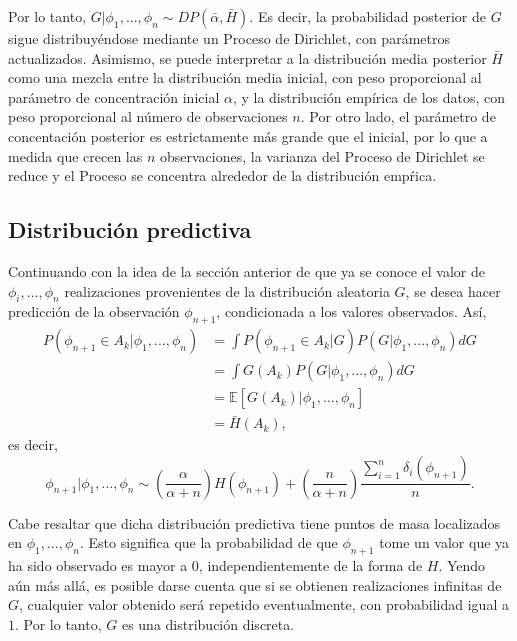 Por lo tanto, $G|\phi_1,...,\phi_n \sim DP(\bar{\alpha},\bar{H})$. Es decir, la probabilidad posterior de $G$ sigue distribuy\'endose mediante un Proceso de Dirichlet, con par\'ametros actualizados. Asimismo, se puede interpretar a la distribuci\'on media posterior $\bar{H}$ como una mezcla entre la distribuci\'on media inicial, con peso proporcional al par\'ametro de concentraci\'on inicial $\alpha$, y la distribuci\'on emp\'irica de los datos, con peso proporcional al n\'umero de observaciones $n$. Por otro lado, el par\'ametro de concentaci\'on posterior es estrictamente m\'as grande que el inicial, por lo que a medida que crecen las $n$ observaciones, la varianza del Proceso de Dirichlet se reduce y el Proceso se concentra alrededor de la distribuci\'on emp\'rica. 

\subsection{Distribuci\'on predictiva}

Continuando con la idea de la secci\'on anterior de que ya se conoce el valor de $\phi_i,...,\phi_n$ realizaciones provenientes de la distribuci\'on aleatoria $G$, se desea hacer predicci\'on de la observaci\'on $\phi_{n+1}$, condicionada a los valores observados. As\'i,
\begin{equation*}
\begin{aligned}
   P(\phi_{n+1} \in A_k|\phi_1,...,\phi_n)
   &= \int P(\phi_{n+1} \in A_k|G) P(G|\phi_1,...,\phi_n) dG \\ 
   &= \int G(A_k) P(G|\phi_1,...,\phi_n) dG \\ 
   &= \mathbb{E}[G(A_k)|\phi_1,...,\phi_n] \\
   &= \bar{H}(A_k),
\end{aligned}    
\end{equation*}
es decir, 
\begin{equation*}
    \phi_{n+1}|\phi_1,...,\phi_n \sim 
    \left(\frac{\alpha}{\alpha + n}\right)H(\phi_{n+1}) + 
    \left(\frac{n}{\alpha + n}\right)\frac{\sum_{i=1}^n \delta_i(\phi_{n+1})}{n}.
\end{equation*}

Cabe resaltar que dicha distribuci\'on predictiva tiene puntos de masa localizados en $\phi_1,...,\phi_n$. Esto significa que la probabilidad de que $\phi_{n+1}$ tome un valor que ya ha sido observado es mayor a $0$, independientemente de la forma de $H$. Yendo a\'un m\'as all\'a, es posible darse cuenta que si se obtienen realizaciones infinitas de $G$, cualquier valor obtenido ser\'a repetido eventualmente, con probabilidad igual a $1$. Por lo tanto, $G$ es una distribuci\'on discreta.

